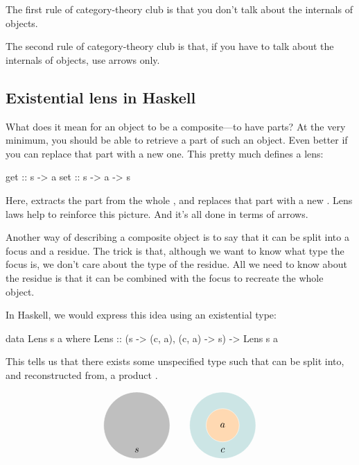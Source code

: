 \documentclass[DaoFP]{subfiles}
\begin{document}
The first rule of category-theory club is that you don't talk about the internals of objects.

The second rule of category-theory club is that, if you have to talk about the internals of objects, use arrows only.

\subsection{Existential lens in Haskell}

What does it mean for an object to be a composite---to have parts? At the very minimum, you should be able to retrieve a part of such an object. Even better if you can replace that part with a new one. This pretty much defines a lens:
\begin{haskell}
get :: s -> a
set :: s -> a -> s
\end{haskell}
Here,  extracts the part  from the whole , and  replaces that part with a new . Lens laws help to reinforce this picture. And it's all done in terms of arrows. 

Another way of describing a composite object is to say that it can be split into a focus and a residue. The trick is that, although we want to know what type the focus is, we don't care about the type of the residue. All we need to know about the residue is that it can be combined with the focus to recreate the whole object. 

In Haskell, we would express this idea using an existential type:
\begin{haskell}
data Lens s a where
    Lens :: (s -> (c, a), (c, a) -> s) -> Lens s a
\end{haskell}
This tells us that there exists some unspecified type  such that  can be split into, and reconstructed from, a product . 

\[
\begin{tikzpicture}
\filldraw[fill=gray!50, draw=white] (0, 0) circle (1.2);
\node at (0, -0.9) {$s$};
\end{tikzpicture}
\hspace{20pt}
\begin{tikzpicture}
\filldraw[fill=blue!50!green!20, draw=white] (0, 0) circle (1.2);
\filldraw[fill=orange!30, draw=white] (0, 0) circle (0.6);
\node at (0, 0) {$a$};
\node at (0, -0.9) {$c$};
\end{tikzpicture}
\]
\end{document}
